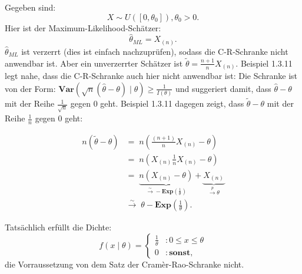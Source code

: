 \documentclass[10pt]{article}
\newcommand{\KW}{\overset{p} \longrightarrow} %
\newcommand{\KV}{\overset{\sim} \longrightarrow} %
\newcommand{\Var}{\textbf{Var}} %
\newenvironment{BSP}[1][]
{\begin{Beispiel}[frametitle=#1]}{\end{Beispiel}}
\begin{document}
	\begin{BSP}[Beispiel 1.4.4 (Anwendung C-R-Schranke Gleichverteilung)]
		Gegeben sind:
		\begin{equation*}
		X {\sim} U([0, \theta_0]), \theta_0 > 0.
		\end{equation*}
		Hier ist der Maximum-Likelihood-Schätzer:
		\begin{equation*}
			\hat{\theta}_{ML} = X_{(n)}.
		\end{equation*}
		$\hat{\theta}_{ML}$ ist verzerrt (dies ist einfach nachzuprüfen), sodass die C-R-Schranke nicht anwendbar ist. Aber ein unverzerrter Schätzer ist $\tilde{\theta} = \frac{n+1}{n} X_{(n)}$. Beispiel 1.3.11 legt nahe, dass die C-R-Schranke auch hier nicht anwendbar ist: Die Schranke ist von der Form: $\Var(\sqrt{n}(\hat{\theta}-\theta)\mid \theta) \geq \frac{1}{I(\theta)}$ und suggeriert damit, dass $\hat{\theta} - \theta$ mit der Reihe $\frac{1}{\sqrt{n}}$ gegen $0$ geht. Beispiel 1.3.11 dagegen zeigt, dass $\tilde{\theta} - \theta$ mit der Reihe $\frac{1}{n}$ gegen $0$ geht:
		
		\begin{equation*}
			\begin{split}
				n(\tilde{\theta} - \theta) &= \; n \left(\frac{(n+1)}{n} X_{(n)}- \theta\right)\\
				&= \; n\left(X_{(n)} \frac{1}{n}X_{(n)}-\theta\right)\\
				&= \; \underbrace{n(X_{(n)} - \theta)}_{\KV - \textbf{Exp}\left(\frac{1}{\theta}\right)} + \underbrace{X_{(n)}}_{\KW \theta}\\
				&\KV \; \theta - \textbf{Exp}\left(\frac{1}{\theta}\right).
			\end{split}
		\end{equation*}
	
		Tatsächlich erfüllt die Dichte:
		\begin{equation*}
			f(x\mid \theta) = 
			\begin{cases}
				\frac{1}{\theta} &: 0 \leq x \leq \theta\\
				0 &: \textbf{sonst},
			\end{cases}
		\end{equation*}
		die Vorraussetzung von dem Satz der Cramèr-Rao-Schranke nicht. 
	\end{BSP}
	
\end{document}
